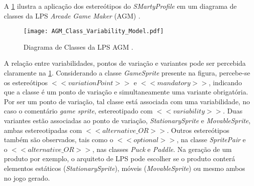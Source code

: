 A \ref{AGM} ilustra a aplicação dos estereótipos do \textit{SMartyProfile} em um diagrama de classes da LPS \textit{Arcade Game Maker} (AGM) .

\begin{figure}[!htb]
	\centering
	\caption{Diagrama de Classes da LPS AGM \cite{OliveiraJuniorJUCS2010}.}	
	\label{AGM}
	\texttt{[image: AGM\_Class\_Variability\_Model.pdf]}
\end{figure}

A relação entre variabilidades, pontos de variação e variantes pode ser percebida claramente na \ref{AGM}. Considerando a classe \textit{GameSprite} presente na figura, percebe-se os estereótipos $<<\textit{variationPoint}>>$ e $<<\textit{mandatory}>>$, indicando que a classe é um ponto de variação e simultaneamente uma variante obrigatória. Por ser um ponto de variação, tal classe está associada com uma variabilidade, no caso o comentário \textit{game sprite}, estereotipado com $<<\textit{variability}>>$. Duas variantes estão associadas ao ponto de variação, \textit{StationarySprite} e \textit{MovableSprite}, ambas estereotipadas com $<<\textit{alternative\_OR}>>$. Outros estereótipos também são observados, tais como o $<<\textit{optional}>>$, na classe \textit{SpritePair} e o $<<\textit{alternative\_OR}>>$, nas classes \textit{Puck} e \textit{Paddle}. Na geração de um produto por exemplo, o arquiteto de LPS pode escolher se o produto conterá elementos estáticos (\textit{StationarySprite}), móveis (\textit{MovableSprite}) ou mesmo ambos no jogo gerado.